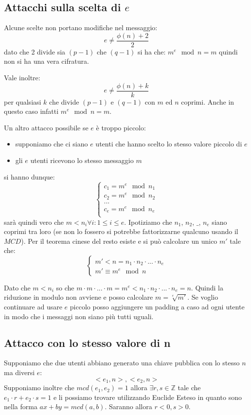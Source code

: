 \subsection{Attacchi sulla scelta di \texorpdfstring{$e$}{e}}
Alcune scelte non portano modifiche nel messaggio:
$$ e \neq \frac{\phi(n) + 2}{2} $$
dato che 2 divide sia $(p-1)$ che $(q-1)$ si ha che: $ m^e \mod n = m $
quindi non si ha una vera cifratura.

Vale inoltre:
$$ e \neq \frac{\phi(n) + k}{k} $$
per qualsiasi $k$ che divide $(p-1)$ e $(q-1)$ con $m$ ed $n$ coprimi.
Anche in questo caso infatti $ m^e \mod n = m $.

Un altro attacco possibile se $e$ è troppo piccolo:
\begin{itemize}
    \item supponiamo che ci siano $e$ utenti che hanno scelto lo stesso valore piccolo di $e$
    \item gli $e$ utenti ricevono lo stesso messaggio $m$
\end{itemize}
si hanno dunque:
\begin{equation}
    \begin{cases}
    c_1 = m^e \mod n_1 \\
    c_2 = m^e \mod n_2 \\
    ... \\
    c_e = m^e \mod n_e \\
    \end{cases}
\end{equation}
sarà quindi vero che $m < n_i \forall i: 1 \leq i \leq e$.
Ipotiziamo che $n_1$, $n_2$, $\_$, $n_e$ siano coprimi tra loro (se non lo fossero si potrebbe fattorizzarne qualcuno usando il $MCD$).
Per il teorema cinese del resto esiste e si può calcolare un unico $m'$ tale che:
\begin{equation}
    \begin{cases}
    m' < n = n_1 \cdot n_2 \cdot ... \cdot n_e \\
    m' \equiv m^e \mod n
    \end{cases}
\end{equation}

Dato che $m < n_i$ so che $m \cdot m \cdot ... \cdot m = m^e < n_1 \cdot n_2 \cdot ... \cdot n_e = n$.
Quindi la riduzione in modulo non avviene e posso calcolare $m = \sqrt[e]{m'}$.
Se voglio continuare ad usare $e$ piccolo posso aggiungere un padding a caso ad ogni utente in modo che i messaggi non siano più tutti uguali.

\subsection{Attacco con lo stesso valore di n}
Supponiamo che due utenti abbiano generato una chiave pubblica con lo stesso $n$ ma diversi $e$:
$$ <e_1,n>, <e_2,n> $$
Supponiamo inoltre che $mcd(e_1, e_2) = 1$ allora $\exists r,s \in \mathbb{Z}$ tale che $e_1 \cdot r + e_2 \cdot s = 1$ e li possiamo trovare utilizzando Euclide Esteso in quanto sono nella forma $ax +by = mcd(a,b)$.
Saranno allora $r<0, s>0$.

